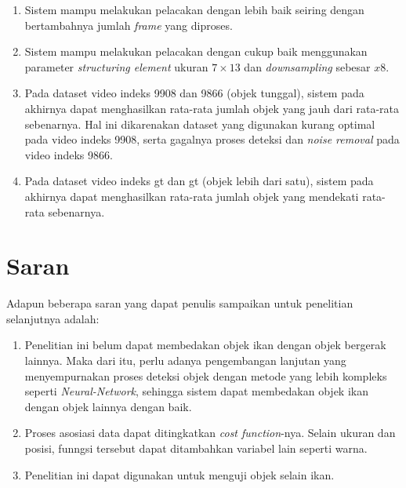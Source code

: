 		\begin{enumerate}
			\item Sistem mampu melakukan pelacakan dengan lebih baik seiring dengan bertambahnya jumlah \textit{frame} yang diproses.
			
			\item Sistem mampu melakukan pelacakan dengan cukup baik menggunakan parameter \textit{structuring element} ukuran $7 \times 13$ dan \textit{downsampling} sebesar $x8$.
			
			\item Pada dataset video indeks 9908 dan 9866 (objek tunggal), sistem pada akhirnya dapat menghasilkan rata-rata jumlah objek yang jauh dari rata-rata sebenarnya. Hal ini dikarenakan dataset yang digunakan kurang optimal pada video indeks 9908, serta gagalnya proses deteksi dan \textit{noise removal} pada video indeks 9866.
			
			\item Pada dataset video indeks gt dan gt (objek lebih dari satu), sistem pada akhirnya dapat menghasilkan rata-rata jumlah objek yang mendekati rata-rata sebenarnya.
		\end{enumerate}
	
	\section{Saran}
		Adapun beberapa saran yang dapat penulis sampaikan untuk penelitian {\tiny }selanjutnya adalah: 
		\begin{enumerate}
			\item Penelitian ini belum dapat membedakan objek ikan dengan objek bergerak lainnya. Maka dari itu, perlu adanya pengembangan lanjutan yang menyempurnakan proses deteksi objek dengan metode yang lebih kompleks seperti \textit{Neural-Network}, sehingga sistem dapat membedakan objek ikan dengan objek lainnya dengan baik.
			
			\item Proses asosiasi data dapat ditingkatkan \textit{cost function}-nya. Selain ukuran dan posisi, funngsi tersebut dapat ditambahkan variabel lain seperti warna.
			
			\item Penelitian ini dapat digunakan untuk menguji objek selain ikan.
		\end{enumerate}

	

\begin{comment}

\end{comment}
